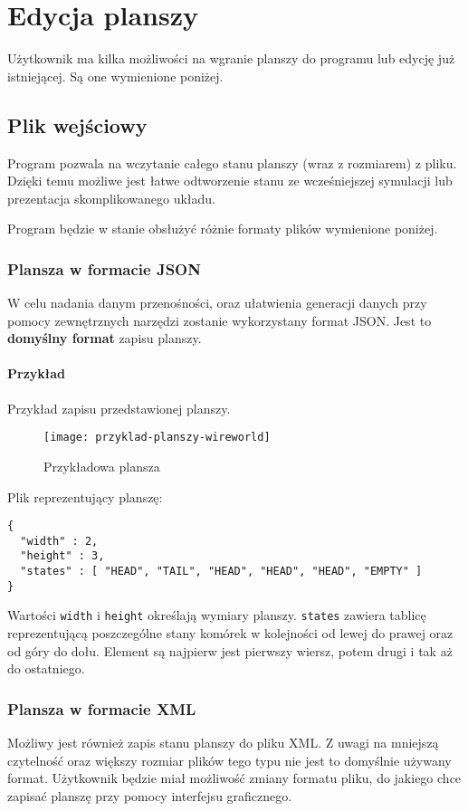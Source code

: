\documentclass{report}
\begin{document}
\chapter{Edycja planszy}
Użytkownik ma kilka możliwości na wgranie planszy do programu lub edycję już istniejącej. Są one wymienione poniżej.

\section{Plik wejściowy}  \label{format}
Program pozwala na wczytanie całego stanu planszy (wraz z rozmiarem) z pliku. Dzięki temu możliwe jest łatwe odtworzenie stanu ze wcześniejszej symulacji lub prezentacja skomplikowanego układu.

Program będzie w stanie obsłużyć różnie formaty plików wymienione poniżej.

\subsection{Plansza w formacie JSON}
W celu nadania danym przenośności, oraz ułatwienia generacji danych przy pomocy zewnętrznych narzędzi zostanie wykorzystany format JSON. Jest to \textbf{domyślny format} zapisu planszy.

\subsubsection{Przykład}
Przykład zapisu przedstawionej planszy. 

\begin{figure}[H]
    \centering
    \texttt{[image: przyklad-planszy-wireworld]}
    \caption{Przykładowa plansza}
\end{figure}

\noindent{}Plik reprezentujący planszę:
\begin{verbatim}
{
  "width" : 2,
  "height" : 3,
  "states" : [ "HEAD", "TAIL", "HEAD", "HEAD", "HEAD", "EMPTY" ]
}
\end{verbatim}

Wartości \texttt{width} i \texttt{height} określają wymiary planszy.
\texttt{states} zawiera tablicę reprezentującą poszczególne stany komórek w kolejności od lewej do prawej oraz od góry do dołu. Element są najpierw jest pierwszy wiersz, potem drugi i tak aż do ostatniego.

\subsection{Plansza w formacie XML}
Możliwy jest również zapis stanu planszy do pliku XML. Z uwagi na mniejszą czytelność oraz większy rozmiar plików tego typu nie jest to domyślnie używany format. Użytkownik będzie miał możliwość zmiany formatu pliku, do jakiego chce zapisać planszę przy pomocy interfejsu graficznego.
\end{document}
